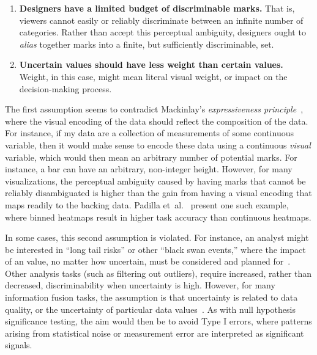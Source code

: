\documentclass{vgtc}                          %
\newcommand{\ea}{{et~al.}\xspace}
\begin{document}
\begin{enumerate}
	\item \textbf{Designers have a limited budget of discriminable marks.} That is, viewers cannot easily or reliably discriminate between an infinite number of categories. Rather than accept this perceptual ambiguity, designers ought to \emph{alias} together marks into a finite, but sufficiently discriminable, set.
	\item \textbf{Uncertain values should have less weight than certain values.} Weight, in this case, might mean literal visual weight, or impact on the decision-making process.
\end{enumerate}

The first assumption seems to contradict Mackinlay's \emph{expressiveness principle}~\cite{mackinlay1986automating}, where the visual encoding of the data should reflect the composition of the data. For instance, if my data are a collection of measurements of some continuous variable, then it would make sense to encode these data using a continuous \emph{visual} variable, which would then mean an arbitrary number of potential marks. For instance, a bar can have an arbitrary, non-integer height. However, for many visualizations, the perceptual ambiguity caused by having marks that cannot be reliably disambiguated is higher than the gain from having a visual encoding that maps readily to the backing data. Padilla \ea~\cite{padilla2017evaluating} present one such example, where binned heatmaps result in higher task accuracy than continuous heatmaps.

In some cases, this second assumption is violated. For instance, an analyst might be interested in ``long tail risks'' or other ``black swan events,'' where the impact of an value, no matter how uncertain, must be considered and planned for~\cite{taleb2011black}. Other analysis tasks (such as filtering out outliers), require increased, rather than decreased, discriminability when uncertainty is high. However, for many information fusion tasks, the assumption is that uncertainty is related to data quality, or the uncertainty of particular data values~\cite{riveiro2007evaluation}. As with null hypothesis significance testing, the aim would then be to avoid Type I errors, where patterns arising from statistical noise or measurement error are interpreted as significant signals.
\end{document}
